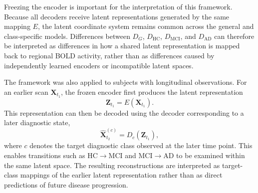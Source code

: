 Freezing the encoder is important for the interpretation of this framework.
Because all decoders receive latent representations generated by the same
mapping $E$, the latent coordinate system remains common across the general
and class-specific models. Differences between
$D_G$, $D_{\mathrm{HC}}$, $D_{\mathrm{MCI}}$, and $D_{\mathrm{AD}}$
can therefore be interpreted as differences in how a shared latent
representation is mapped back to regional BOLD activity, rather than as
differences caused by independently learned encoders or incompatible latent
spaces.

The framework was also applied to subjects with longitudinal observations.
For an earlier scan $\mathbf{X}_{t_1}$, the frozen encoder first produces
the latent representation
\begin{equation}
    \mathbf{Z}_{t_1}
    =
    E(\mathbf{X}_{t_1}).
\end{equation}
This representation can then be decoded using the decoder corresponding to
a later diagnostic state,
\begin{equation}
    \hat{\mathbf{X}}_{t_2}^{(c)}
    =
    D_c(\mathbf{Z}_{t_1}),
\end{equation}
where $c$ denotes the target diagnostic class observed at the later time
point. This enables transitions such as HC$\rightarrow$MCI and
MCI$\rightarrow$AD to be examined within the same latent space. The
resulting reconstructions are interpreted as target-class mappings of the
earlier latent representation rather than as direct predictions of future
disease progression.